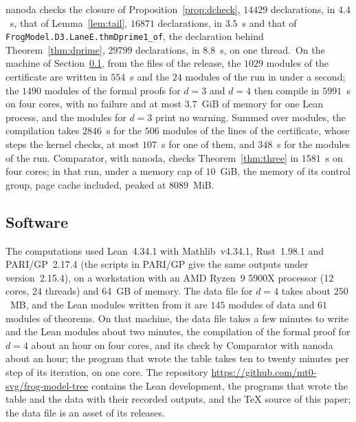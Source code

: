 \documentclass[11pt]{amsart}
\newcommand{\repo}{https://github.com/mt0-svg/frog-model-tree}
\theoremstyle{definition}
\numberwithin{equation}{section}
\newcommand{\computed}[1]{\ignorespaces}
\begin{document}
nanoda checks the closure of Proposition~\ref{prop:dcheck}, $14429$ declarations, in $4.4$~s, that of Lemma~\ref{lem:tail}, $16871$ declarations, in $3.5$~s and that of \texttt{FrogModel.D3.LaneE.thmDprime1\_of}, the declaration behind Theorem~\ref{thm:dprime}, $29799$ declarations, in $8.8$~s, on one thread.\computed{records/nanoda/run_nanoda.sh, records/nanoda/nanoda.json, records/nanoda/out/nanoda.txt}\ On the machine of Section~\ref{sec:comp-soft}, from the files of the release, the $1029$ modules of the certificate are written in $554$~s and the $24$ modules of the run in under a second; the $1490$ modules of the formal proofs for $d=3$ and $d=4$ then compile in $5991$~s on four cores, with no failure and at most $3.7$~GiB of memory for one Lean process, and the modules for $d=3$ print no warning. Summed over modules, the compilation takes $2846$~s for the $506$ modules of the lines of the certificate, whose steps the kernel checks, at most $107$~s for one of them, and $348$~s for the modules of the run. Comparator, with nanoda, checks Theorem~\ref{thm:three} in $1581$~s on four cores; in that run, under a memory cap of $10$~GiB, the memory of its control group, page cache included, peaked at $8089$~MiB.\computed{records/build/release-build.sh, records/build/out/release-build.out, records/build/out/release-build-clean_build.out, records/build/release-build-times.sh, records/build/out/release-build-times.out, records/comparator/run_comparator.sh, records/comparator/out/comparator.txt}

\subsection{Software}\label{sec:comp-soft}\computed{rust-toolchain.toml, .github/workflows/ci.yml, records/writers/writers-local.sh, records/writers/out/writers-local.out, code/certificate/out/gen.out, code/g3k/modules.sha256}
The computations used Lean~4.34.1 with Mathlib~v4.34.1, Rust~1.98.1 and PARI/GP~2.17.4 \cite{PARI} (the scripts in PARI/GP give the same outputs under version~2.15.4), on a workstation with an AMD Ryzen~9 5900X processor (12 cores, 24 threads) and 64~GB of memory. The data file for $d=4$ takes about $250$~MB, and the Lean modules written from it are $145$ modules of data and $61$ modules of theorems. On that machine, the data file takes a few minutes to write and the Lean modules about two minutes, the compilation of the formal proof for $d=4$ about an hour on four cores, and its check by Comparator with nanoda about an hour; the program that wrote the table takes ten to twenty minutes per step of its iteration, on one core. The repository \url{\repo} contains the Lean development, the programs that wrote the table and the data with their recorded outputs, and the \TeX{} source of this paper; the data file is an asset of its releases.
\end{document}
